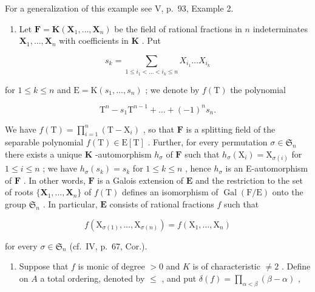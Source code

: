 For a generalization of this example see V, p.~93, Example 2.

\begin{enumerate}
\def\labelenumi{\arabic{enumi})}
\setcounter{enumi}{4}
\tightlist
\item
  Let \(\mathbf{F} = \mathbf{K}(\mathbf{X}_1, \ldots, \mathbf{X}_n)\) be the field of rational fractions in \(n\) indeterminates \(\mathbf{X}_1, \ldots, \mathbf{X}_n\) with coefficients in \(\mathbf{K}\) . Put
\end{enumerate}

\[
s _ {k} = \sum_ {1 \leqslant i _ {1} <   \dots <   i _ {k} \leqslant n} X _ {i _ {1}} \dots X _ {i _ {k}}
\]

for \(1 \leqslant k \leqslant n\) and \(\mathrm{E} = \mathrm{K}(s_1, \ldots, s_n)\) ; we denote by \(f(\mathrm{T})\) the polynomial

\[
\mathrm{T} ^ {n} - s _ {1} \mathrm{T} ^ {n - 1} + \dots + (- 1) ^ {n} s _ {n}.
\]

We have \(f(\mathrm{T}) = \prod_{i=1}^{n} (\mathrm{T} - \mathrm{X}_i)\) , so that \(\mathbf{F}\) is a splitting field of the separable polynomial \(f(\mathrm{T}) \in \mathrm{E}[\mathrm{T}]\) . Further, for every permutation \(\sigma \in \mathfrak{S}_n\) there exists a unique \(\mathbf{K}\) -automorphism \(h_\sigma\) of \(\mathbf{F}\) such that \(h_\sigma(\mathrm{X}_i) = \mathrm{X}_{\sigma(i)}\) for \(1 \leqslant i \leqslant n\) ; we have \(h_\sigma(s_k) = s_k\) for \(1 \leqslant k \leqslant n\) , hence \(h_\sigma\) is an E-automorphism of \(\mathbf{F}\) . In other words, \(\mathbf{F}\) is a Galois extension of \(\mathbf{E}\) and the restriction to the set of roots \(\{\mathbf{X}_1, ..., \mathbf{X}_n\}\) of \(f(\mathrm{T})\) defines an isomorphism of \(\operatorname{Gal}(\mathrm{F}/\mathrm{E})\) onto the group \(\mathfrak{S}_n\) . In particular, \(\mathbf{E}\) consists of rational fractions \(f\) such that

\[
f \left(\mathrm{X} _ {\sigma (1)}, \dots , \mathrm{X} _ {\sigma (n)}\right) = f \left(\mathrm{X} _ {1}, \dots , \mathrm{X} _ {n}\right)
\]

for every \(\sigma \in \mathfrak{S}_n\) (cf.~IV, p.~67, Cor.).

\begin{enumerate}
\def\labelenumi{\arabic{enumi})}
\setcounter{enumi}{5}
\tightlist
\item
  Suppose that \(f\) is monic of degree \(> 0\) and \(K\) is of characteristic \(\neq 2\) . Define on \(A\) a total ordering, denoted by \(\leqslant\) , and put \(\delta(f) = \prod_{\alpha < \beta} (\beta - \alpha)\) ,
\end{enumerate}

